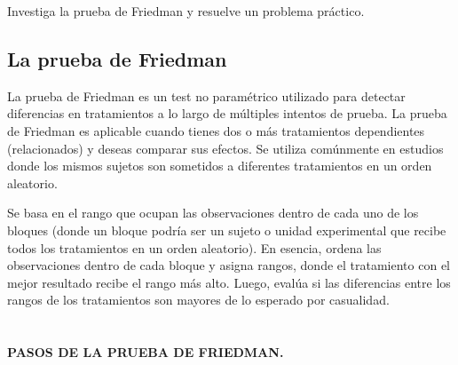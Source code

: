 \documentclass{article}
\begin{document}
Investiga la prueba de Friedman y resuelve un problema práctico.

\subsection*{La prueba de Friedman}

La prueba de Friedman es un test no paramétrico utilizado para detectar diferencias en tratamientos a lo largo de múltiples intentos de prueba. La prueba de Friedman es aplicable cuando tienes dos o más tratamientos dependientes (relacionados) y deseas comparar sus efectos. Se utiliza comúnmente en estudios donde los mismos sujetos son sometidos a diferentes tratamientos en un orden aleatorio.

Se basa en el rango que ocupan las observaciones dentro de cada uno de los bloques (donde un bloque podría ser un sujeto o unidad experimental que recibe todos los tratamientos en un orden aleatorio). En esencia, ordena las observaciones dentro de cada bloque y asigna rangos, donde el tratamiento con el mejor resultado recibe el rango más alto. Luego, evalúa si las diferencias entre los rangos de los tratamientos son mayores de lo esperado por casualidad.
\\  \\ \\
\textbf{PASOS DE LA PRUEBA DE FRIEDMAN.}
\end{document}
